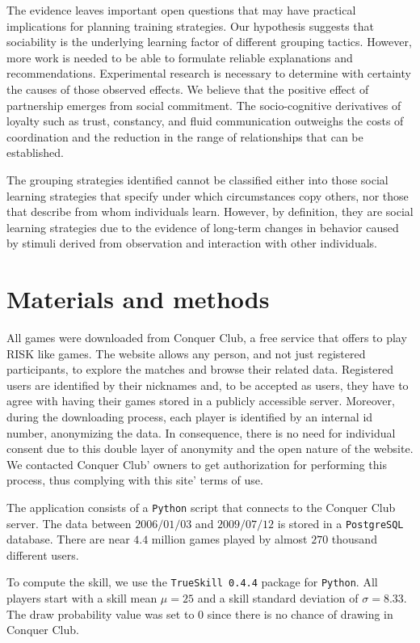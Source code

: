 \documentclass[a4paper,10pt]{book}
\theoremstyle{definition}
\begin{document}
The evidence leaves important open questions that may have practical implications for planning training strategies.
Our hypothesis suggests that sociability is the underlying learning factor of different grouping tactics.
However, more work is needed to be able to formulate reliable explanations and recommendations.
Experimental research is necessary to determine with certainty the causes of those observed effects.
We believe that the positive effect of partnership emerges from social commitment.
The socio-cognitive derivatives of loyalty such as trust, constancy, and fluid communication outweighs the costs of coordination and the reduction in the range of relationships that can be established.

The grouping strategies identified cannot be classified either into those social learning strategies that specify under which circumstances copy others, nor those that describe from whom individuals learn.
However, by definition, they are social learning strategies due to the evidence of long-term changes in behavior caused by stimuli derived from observation and interaction with other individuals.

\section{Materials and methods}


All games were downloaded from Conquer Club, a free service that offers to play RISK like games.
The website allows any person, and not just registered participants, to explore the matches and browse their related data.
Registered users are identified by their nicknames and, to be accepted as users, they have to agree with having their games stored in a publicly accessible server.
Moreover, during the downloading process, each player is identified by an internal id number, anonymizing the data.
In consequence, there is no need for individual consent due to this double layer of anonymity and the open nature of the website.
We contacted Conquer Club' owners to get authorization for performing this process, thus complying with this site' terms of use.

The application consists of a \texttt{Python} script that connects to the Conquer Club server.
The data between $2006/01/03$ and $2009/07/12$ is stored in a \texttt{PostgreSQL} database.
There are near $4.4$ million games played by almost $270$ thousand different users.

To compute the skill, we use the \texttt{TrueSkill 0.4.4} package for \texttt{Python}.
All players start with a skill mean $\mu = 25$ and a skill standard deviation of $\sigma = 8.33$.
The draw probability value was set to 0 since there is no chance of drawing in Conquer Club. 
\end{document}
